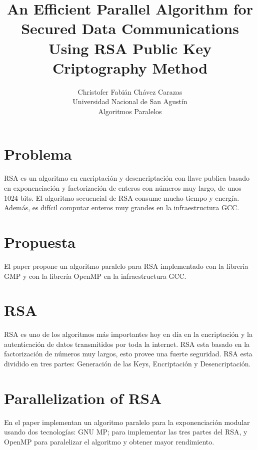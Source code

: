 \documentclass[a4paper,12pt]{article}
\begin{document}
\title{An Efficient Parallel Algorithm for Secured Data Communications Using RSA Public Key Criptography Method}
\author{
Christofer Fabián Chávez Carazas \\
\small{Universidad Nacional de San Agustín} \\
\small{Algoritmos Paralelos}
}

\maketitle

\section{Problema}

RSA es un algoritmo en encriptación y desencriptación con llave publica
basado en exponenciación y factorización de enteros con números muy largo,
de unos 1024 bits. El algoritmo secuencial de RSA consume mucho tiempo y energía.
Además, es difícil computar enteros muy grandes en la infraestructura GCC.

\section{Propuesta}

El paper propone un algoritmo paralelo para RSA implementado con la libreria
GMP y con la librería OpenMP en la infraestructura GCC.

\section{RSA}

RSA es uno de los algoritmos más importantes hoy en día en la encriptación
y la autenticación de datos transmitidos por toda la internet. RSA esta basado 
en la factorización de números muy largos, esto provee una fuerte seguridad.
RSA esta dividido en tres partes: Generación de las Keys, Encriptación y Desencriptación.\\

\section{Parallelization of RSA}

En el paper implementan un algoritmo paralelo para la exponenciación modular
usando dos tecnologías: GNU MP; para implementar las tres partes del RSA, y OpenMP para paralelizar el algoritmo
y obtener mayor rendimiento.
\end{document}

